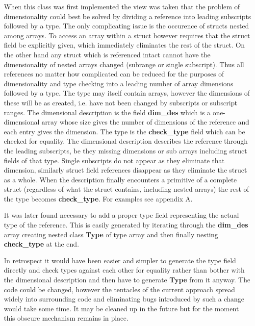                 When this class was first implemented the view was taken that
                the problem of dimensionality could best be solved by dividing
                a reference into leading subscripts followed by a type. The
                only complicating issue is the occurence of structs nested
                among arrays. To access an array within a struct however requires
                that the struct field be explicitly given, which immediately
                eliminates the rest of the struct. On the other hand any struct
                which is referenced intact cannot have the dimensionality of
                nested arrays changed (subrange or single subscript). Thus all
                references no matter how complicated can be reduced for the
                purposes of dimensionality and type checking into a leading
                number of array dimensions followed by a type. The type
                may itself contain arrays, however the dimensions of these
                will be as created, i.e. have not been changed by subscripts
                or subscript ranges. The dimensional description is the field
                {\bf dim\_des} which is a one-dimensional array whose size
                gives the number of dimensions of the reference and each entry
                gives the dimension. The type is the {\bf check\_type} field
                which can be checked for equality. The dimensional description
                describes the reference through the leading subscripts, be they
                missing dimensions or sub arrays including struct fields of that
                type. Single subscripts do not appear as they eliminate that
                dimension, similarly struct field references disappear as they
                eliminate the struct as a whole. When the description finally
                encounters a primitive of a complete struct (regardless of what
                the struct contains, including nested arrays) the rest of
                the type becomes {\bf check\_type}. For examples see appendix A.

                It was later found necessary to add a proper type field representing
                the actual type of the reference. This is easily generated by
                iterating through the {\bf dim\_des} array creating nested
                class {\bf Type} of type array and then finally nesting
                {\bf check\_type} at the end.

                In retrospect it would have been easier and simpler to generate
                the type field directly and check types against each other for
                equality rather than bother with the dimensional description and
                then have to generate {\bf Type} from it anyway. The code could be
                changed, however the tentacles of the current approach spread
                widely into surrounding code and eliminating bugs introduced by
                such a change would take some time. It may be cleaned up in the
                future but for the moment this obscure mechanism remains in place.
